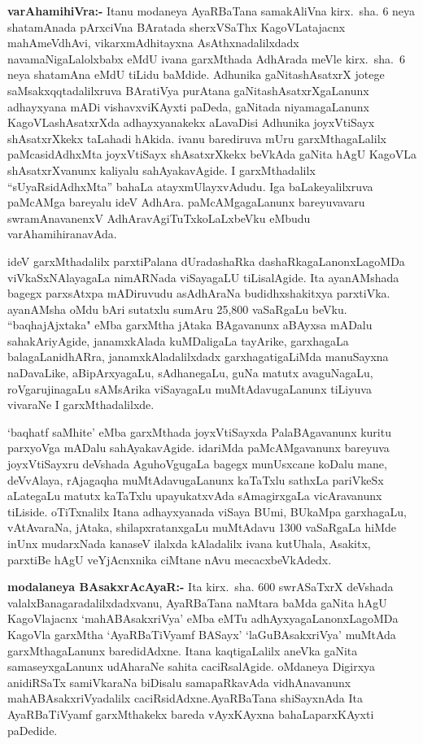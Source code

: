 \textbf{varAhamihiVra:-} Itanu modaneya AyaRBaTana samakAliVna kirx.~sha. {\rm 6} neya shatamAnada pArxciVna BAratada sherxVSaThx KagoVLatajacnx mahAmeVdhAvi, vikarxmAdhitayxna AsAthxnadalilxdadx navamaNigaLalolxbabx eMdU ivana garxMthada AdhArada meVle kirx.~sha.~{\rm 6} neya shatamAna eMdU tiLidu baMdide. Adhunika gaNitashAsatxrX jotege saMsakxqqtadalilxruva BAra\-tiVya purAtana gaNitashAsatxrXgaLanunx adhayxyana mADi vishavxviKAyxti paDeda, gaNitada niyama\-gaLanunx KagoVLashAsatxrXda adhayxyanakekx aLavaDisi Adhunika joyxVtiSayx shAsatxrXkekx taLahadi hAkida. ivanu barediruva mUru garxMthagaLalilx paMcasidAdhxMta joyxVtiSayx shAsatxrXkekx beVkAda gaNita hAgU KagoVLa shAsatxrXvanunx kaliyalu sahAyakavAgide. I garxMthadalilx ``sUyaRsidAdhxMta'' bahaLa atayxmUlayxvAdudu. Iga baLakeyalilxruva paMcAMga bareyalu ideV AdhAra. paMcAMgagaLanunx bareyuvavaru swramAnavanenxV AdhAravAgiTuTxkoLaLxbeVku eMbudu varAhamihiranavAda.

ideV garxMthadalilx parxtiPalana dUradashaRka dashaRkagaLanonxLagoMDa viVkaSxNAlaya\-gaLa nimARNada viSayagaLU tiLisalAgide. Ita ayanAMshada bagegx parxsAtxpa mADiru\-vudu asAdhAraNa budidhxshakitxya parxtiVka. ayanAMsha oMdu bAri sutatxlu sumAru {\rm 25,800} vaSaRgaLu beVku. ``baqhajAjxtaka" eMba garxMtha jAtaka BAgavanunx aBAyxsa mADalu sahakAriyAgide, janamxkAlada kuMDaligaLa tayArike, garxhagaLa balagaLa\break nidhARra, janamxkAladalilxdadx garxhagatigaLiMda manuSayxna naDavaLike, aBipArxyagaLu, sAdhane\-gaLu, guNa matutx avaguNagaLu, roVgarujinagaLu sAMsArika viSayagaLu muMtAda\-vugaLanunx tiLiyuva vivaraNe I garxMthadalilxde.

`baqhatf saMhite' eMba garxMthada joyxVtiSayxda PalaBAgavanunx kuritu parxyoVga mADalu sahAyakavAgide. idariMda paMcAMgavanunx bareyuva joyxVtiSayxru deVshada AguhoVgugaLa bagegx munUsxcane koDalu mane, deVvAlaya, rAjagaqha muMtAdavugaLanunx kaTaTxlu sathxLa pariVkeSx aLategaLu matutx kaTaTxlu upayukatxvAda sAmagirxgaLa vicAravanunx tiLiside. oTiTxnalilx Itana adhayxyanada viSaya BUmi, BUkaMpa garxhagaLu, vAtAvaraNa, jAtaka, shilapxratanxgaLu muMtAdavu {\rm 1300} vaSaRgaLa hiMde inUnx mudarxNada kanaseV ilalxda kAladalilx ivana kutUhala, Asakitx, parxtiBe hAgU veYjAcnxnika ciMtane nAvu mecacxbeVkAdedx.

\textbf{modalaneya BAsakxrAcAyaR:-} Ita kirx.~sha. {\rm 600} swrASaTxrX deVshada valalxBanagara\-dalilxdadxvanu, AyaRBaTana naMtara baMda gaNita hAgU  KagoVlajacnx `mahABAsakxriVya' eMba eMTu adhAyxyagaLanonxLagoMDa KagoVla garxMtha `AyaRBaTiVyamf BASayx' `laGuBAsakxriVya' muMtAda garxMthagaLanunx baredidAdxne. Itana kaqtigaLalilx aneVka gaNita samaseyxgaLanunx udAharaNe sahita caciRsalAgide. oMdaneya Digirxya anidiRSaTx samiV\-karaNa biDisalu samapaRkavAda vidhAnavanunx mahABAsakxriVyadalilx caciRsidAdxne.\break AyaRBaTana shiSayxnAda Ita AyaRBaTiVyamf garxMthakekx bareda vAyxKAyxna bahaLa\break parxKAyxti paDedide. 

